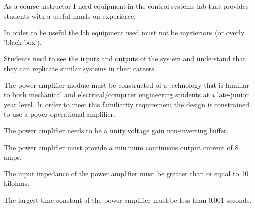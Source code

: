 As a course instructor I need equipment in the control systems lab that provides students with a useful hands-on experience.
\bigskip
  
In order to be useful the lab equipment used must not be mysterious (or overly 'black box').
\bigskip
  
Students need to see the inputs and outputs of the system and understand that they can replicate similar systems in their careers.
\bigskip
		
The power amplifier module must be constructed of a technology that is familiar to both mechanical and electrical/computer engineering students at a late-junior year level.  In order to meet this familiarity requirement the design is constrained to use a power operational amplifier.
\bigskip
		
The power amplifier needs to be a unity voltage gain non-inverting buffer. 
\bigskip

The power amplifier must provide a minimum continuous output current of 8 amps.
\bigskip

The input impedance of the power amplifier must be greater than or equal to 10 kilohms.
\bigskip
		
The largest time constant of the power amplifier must be less than 0.001 seconds.
\bigskip
